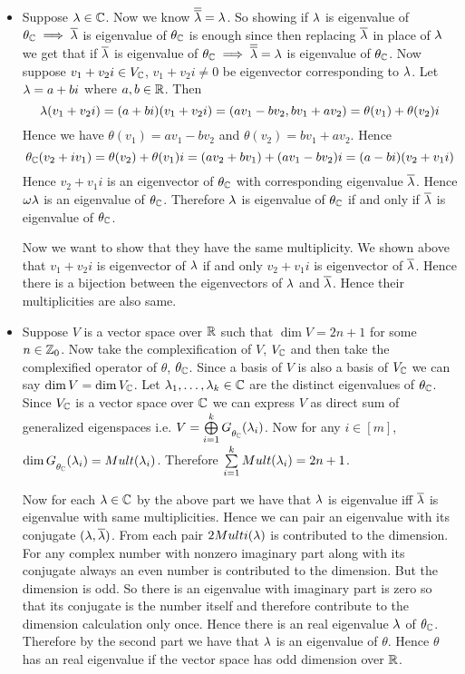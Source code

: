 \documentclass[a4paper, 11pt]{article}
\begin{document}
{\begin{itemize}[label=$\bullet$]
\begin{itemize}
\item Suppose $\lambda \in \mathbb{C}$. Now we know $\overline{\overline{\lambda}}=\lambda$. So showing if $\lambda$ is eigenvalue of $\theta_{\mathbb{C}}\implies \overline{\lambda}$ is eigenvalue of $\theta_{\mathbb{C}}$ is enough since then replacing $\overline{\lambda}$ in place of $\lambda$ we get that if $\overline{\lambda}$ is eigenvalue of $\theta_{\mathbb{C}}\implies \overline{\overline{\lambda}}=\lambda$ is eigenvalue of $\theta_{\mathbb{C}}$. Now suppose $v_1+v_2i\in V_{\mathbb{C}}$, $v_1+v_2i\neq  0$ be eigenvector corresponding to $\lambda$. Let $\lambda=a+bi$ where $a,b\in \mathbb{R}$. Then $$\lambda(v_1+v_2i)=(a+bi)(v_1+v_2i)=(av_1-bv_2,bv_1+av_2)=\theta(v_1)+\theta(v_2)i$$Hence we have $\theta(v_1)=av_1-bv_2$ and $\theta(v_2)=bv_1+av_2$. Hence $$\theta_{\mathbb{C}}(v_2+iv_1)=\theta(v_2)+\theta(v_1)i=(av_2+bv_1)+(av_1-bv_2)i=(a-bi)(v_2+v_1i)$$Hence $v_2+v_1i$ is an eigenvector of $\theta_{\mathbb{C}}$ with corresponding eigenvalue $\overline{\lambda}$. Hence $\omega{\lambda}$ is an eigenvalue of $\theta_{\mathbb{C}}$. Therefore $\lambda$ is eigenvalue of $\theta_{\mathbb{C}}$ if and only if $\overline{\lambda}$ is eigenvalue of $\theta_{\mathbb{C}}$. \parinn

Now we want to show that they have the same multiplicity. We shown above that $v_1+v_2i$ is eigenvector of $\lambda$ if and only $v_2+v_1i$ is eigenvector of $\overline{\lambda}$. Hence there is a bijection between the eigenvectors of $\lambda$ and $\overline{\lambda}$. Hence their multiplicities are also same.

\item Suppose $V$ is a vector space over $\mathbb{R}$ such that $\dim V=2n+1$ for some $n\in  \mathbb{Z}_0$. Now take the complexification of $V$, $V_{\mathbb{C}}$ and then take the complexified operator of $\theta$, $\theta_{\mathbb{C}}$. Since a basis of $V$ is also a basis of $V_{\mathbb{C}}$ we can say $\dim V=\dim V_{\mathbb{C}}$.  Let $\lambda_1,\dots, \lambda_k\in\mathbb{C}$ are the distinct eigenvalues of $\theta_{\mathbb{C}}$. Since $V_{\mathbb{C}}$ is a vector space over $\mathbb{C}$ we can express $V$ as direct sum of generalized eigenspaces i.e. $V=\bigoplus\limits_{i=1}^k G\strut_{\theta_{\mathbb{C}}}(\lambda_i)$. Now for any $i\in[m]$, $\dim G\strut_{\theta_{\mathbb{C}}}(\lambda_i)=Mult(\lambda_i)$. Therefore $\sum\limits_{i=1}^k Mult(\lambda_i)=2n+1$. \parinn

Now for each $\lambda\in \mathbb{C}$ by the above part we have that $\lambda$ is eigenvalue iff $\overline{\lambda}$ is eigenvalue with same multiplicities. Hence we can pair an eigenvalue with its conjugate $(\lambda,\overline{\lambda})$. From each pair $2Multi(\lambda)$ is contributed to the dimension. For any complex number with nonzero imaginary part along with its conjugate always an even number is contributed to the dimension. But the dimension is odd. So there is an eigenvalue with imaginary part is zero so that its conjugate is the number itself and therefore contribute to the dimension calculation only once. Hence there is an real eigenvalue $\lambda$ of $\theta_{\mathbb{C}}$. Therefore by the second part we have that $\lambda$ is an eigenvalue of $\theta$. Hence $\theta$ has an real eigenvalue if the vector space has odd dimension over $\mathbb{R}$. 
\end{itemize}
\end{itemize}
}
\end{document}
